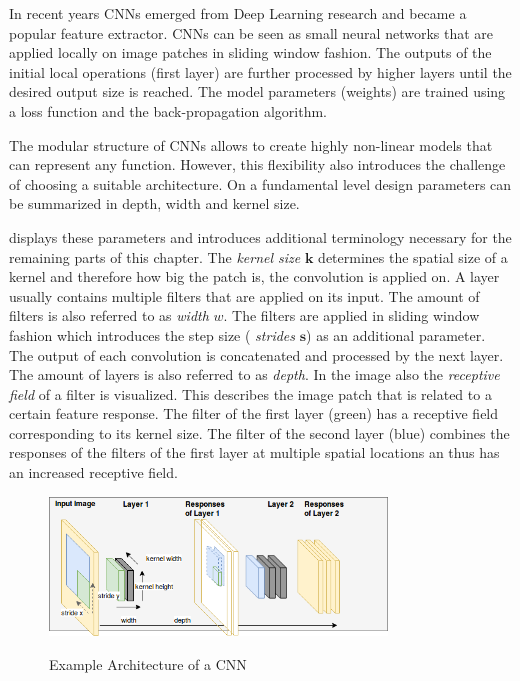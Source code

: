 In recent years \acp{CNN} emerged from Deep Learning research and became a popular feature extractor. \acp{CNN} can be seen as small neural networks that are applied locally on image patches in sliding window fashion. The outputs of the initial local operations (first layer) are further processed by higher layers until the desired output size is reached. The model parameters (weights) are trained using a loss function and the back-propagation algorithm.

The modular structure of \acp{CNN} allows to create highly non-linear models that can represent any function. However, this flexibility also introduces the challenge of choosing a suitable architecture. On a fundamental level design parameters can be summarized in depth, width and kernel size. 

 displays these parameters and introduces additional terminology necessary for the remaining parts of this chapter. The \textit{kernel size} $\textbf{k}$ determines the spatial size of a kernel and therefore how big the patch is, the convolution is applied on. A layer usually contains multiple filters that are applied on its input. The amount of filters is also referred to as \textit{width} $w$. The filters are applied in sliding window fashion which introduces the step size ( \textit{strides} $\mathbf{s}$) as an additional parameter. The output of each convolution is concatenated and processed by the next layer. The amount of layers is also referred to as \textit{depth}. In the image also the \textit{receptive field} of a filter is visualized. This describes the image patch that is related to a certain feature response. The filter of the first layer (green) has a receptive field corresponding to its kernel size. The filter of the second layer (blue) combines the responses of the filters of the first layer at multiple spatial locations an thus has an increased receptive field.

\begin{figure}[hbtp]
	\centering
	\includegraphics[width=0.8\textwidth]{fig/model_design}
	\label{fig:model_design}
	\caption{Example Architecture of a \ac{CNN}}
\end{figure}

